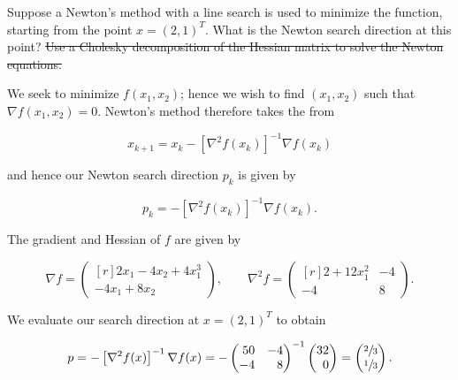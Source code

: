 Suppose a Newton's method with a line search is used to minimize the function, starting from the point $x = (2, 1)^T$.
What is the Newton search direction at this point? \sout{Use a Cholesky decomposition of the Hessian matrix to solve the
Newton equations.}

\begin{solution}
    We seek to minimize $f(x_1, x_2)$; hence we wish to find $(x_1, x_2)$ such that $\nabla f(x_1, x_2) = 0$. Newton's 
    method therefore takes the from
    
    $$
    x_{k+1} = x_{k} - \left[ \nabla^2 f(x_k) \right]^{-1} \nabla f(x_k)
    $$

    and hence our Newton search direction $p_k$ is given by

    $$
    p_k = - \left[ \nabla^2 f(x_k) \right]^{-1} \nabla f(x_k).
    $$

    The gradient and Hessian of $f$ are given by

    $$
    \nabla f = \begin{pmatrix*}[r]
         2 x_1 - 4 x_2 + 4 x_1^3 \\
        -4 x_1 + 8 x_2 
    \end{pmatrix*}, \qquad \nabla^2 f = \begin{pmatrix*}[r]
         2 + 12 x_1^2 & -4 \\
        -4            &  8
    \end{pmatrix*}.
    $$

    We evaluate our search direction at $x = (2, 1)^T$ to obtain

    $$
    p = - \left[ \nabla^2 f(x) \right]^{-1} \nabla f(x) = - \begin{pmatrix*}[r]
        50 & -4 \\
        -4 &  8
    \end{pmatrix*}^{-1} \begin{pmatrix*}[r]
        32 \\
        0
    \end{pmatrix*} = \begin{pmatrix*}[r]
        \sfrac{2}{3} \\
        \sfrac{1}{3}
    \end{pmatrix*}.
    $$
    \ \\
\end{solution}
